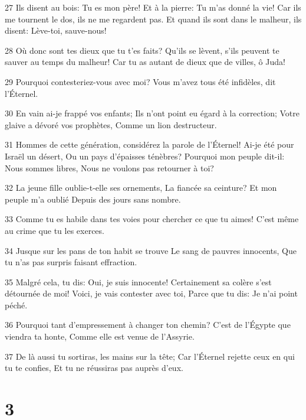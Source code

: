 \par 27 Ils disent au bois: Tu es mon père! Et à la pierre: Tu m'as donné la vie! Car ils me tournent le dos, ils ne me regardent pas. Et quand ils sont dans le malheur, ils disent: Lève-toi, sauve-nous!
\par 28 Où donc sont tes dieux que tu t'es faits? Qu'ils se lèvent, s'ils peuvent te sauver au temps du malheur! Car tu as autant de dieux que de villes, ô Juda!
\par 29 Pourquoi contesteriez-vous avec moi? Vous m'avez tous été infidèles, dit l'Éternel.
\par 30 En vain ai-je frappé vos enfants; Ils n'ont point eu égard à la correction; Votre glaive a dévoré vos prophètes, Comme un lion destructeur.
\par 31 Hommes de cette génération, considérez la parole de l'Éternel! Ai-je été pour Israël un désert, Ou un pays d'épaisses ténèbres? Pourquoi mon peuple dit-il: Nous sommes libres, Nous ne voulons pas retourner à toi?
\par 32 La jeune fille oublie-t-elle ses ornements, La fiancée sa ceinture? Et mon peuple m'a oublié Depuis des jours sans nombre.
\par 33 Comme tu es habile dans tes voies pour chercher ce que tu aimes! C'est même au crime que tu les exerces.
\par 34 Jusque sur les pans de ton habit se trouve Le sang de pauvres innocents, Que tu n'as pas surpris faisant effraction.
\par 35 Malgré cela, tu dis: Oui, je suis innocente! Certainement sa colère s'est détournée de moi! Voici, je vais contester avec toi, Parce que tu dis: Je n'ai point péché.
\par 36 Pourquoi tant d'empressement à changer ton chemin? C'est de l'Égypte que viendra ta honte, Comme elle est venue de l'Assyrie.
\par 37 De là aussi tu sortiras, les mains sur la tête; Car l'Éternel rejette ceux en qui tu te confies, Et tu ne réussiras pas auprès d'eux.

\chapter{3}

